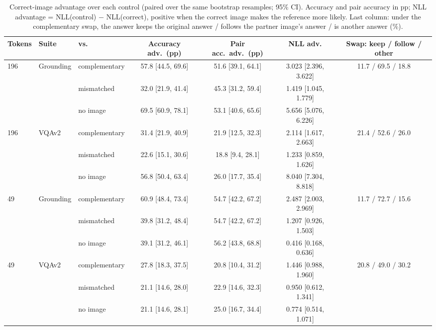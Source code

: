 \begin{table}[htbp]
\centering
\small
\caption{Correct-image advantage over each control (paired over the same bootstrap resamples; 95\% CI). Accuracy and pair accuracy in pp; NLL advantage = NLL(control) $-$ NLL(correct), positive when the correct image makes the reference more likely. Last column: under the complementary swap, the answer keeps the original answer / follows the partner image's answer / is another answer (\%).}
\label{tab:t2-advantages}
\begin{adjustbox}{max width=\linewidth}
\begin{tabular}{lllcccc}
\toprule
Tokens & Suite & vs. & Accuracy adv.\ (pp) & Pair acc.\ adv.\ (pp) & NLL adv. & Swap: keep / follow / other \\
\midrule
196 & Grounding & complementary & 57.8 [44.5, 69.6] & 51.6 [39.1, 64.1] & 3.023 [2.396, 3.622] & 11.7 / 69.5 / 18.8 \\
 &  & mismatched & 32.0 [21.9, 41.4] & 45.3 [31.2, 59.4] & 1.419 [1.045, 1.779] &  \\
 &  & no image & 69.5 [60.9, 78.1] & 53.1 [40.6, 65.6] & 5.656 [5.076, 6.226] &  \\
\midrule
196 & VQAv2 & complementary & 31.4 [21.9, 40.9] & 21.9 [12.5, 32.3] & 2.114 [1.617, 2.663] & 21.4 / 52.6 / 26.0 \\
 &  & mismatched & 22.6 [15.1, 30.6] & 18.8 [9.4, 28.1] & 1.233 [0.859, 1.626] &  \\
 &  & no image & 56.8 [50.4, 63.4] & 26.0 [17.7, 35.4] & 8.040 [7.304, 8.818] &  \\
\midrule
49 & Grounding & complementary & 60.9 [48.4, 73.4] & 54.7 [42.2, 67.2] & 2.487 [2.003, 2.969] & 11.7 / 72.7 / 15.6 \\
 &  & mismatched & 39.8 [31.2, 48.4] & 54.7 [42.2, 67.2] & 1.207 [0.926, 1.503] &  \\
 &  & no image & 39.1 [31.2, 46.1] & 56.2 [43.8, 68.8] & 0.416 [0.168, 0.636] &  \\
\midrule
49 & VQAv2 & complementary & 27.8 [18.3, 37.5] & 20.8 [10.4, 31.2] & 1.446 [0.988, 1.960] & 20.8 / 49.0 / 30.2 \\
 &  & mismatched & 21.1 [14.6, 28.0] & 22.9 [14.6, 32.3] & 0.950 [0.612, 1.341] &  \\
 &  & no image & 21.1 [14.6, 28.1] & 25.0 [16.7, 34.4] & 0.774 [0.514, 1.071] &  \\
\bottomrule
\end{tabular}
\end{adjustbox}
\end{table}
